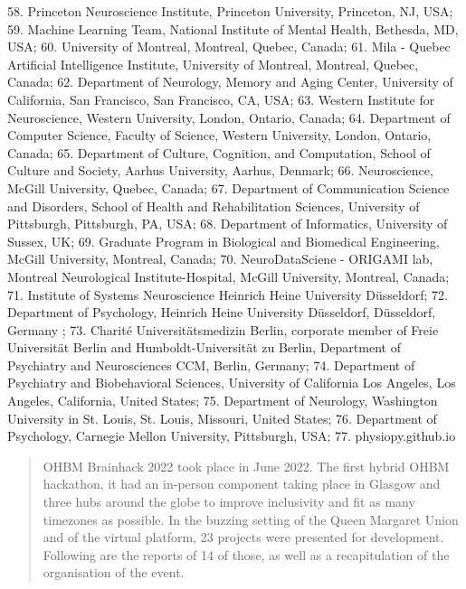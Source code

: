 \documentclass[10pt,a4paper,twocolumns]{proc}
\begin{document}
{58. Princeton Neuroscience Institute, Princeton University, Princeton, NJ, USA; %
59. Machine Learning Team, National Institute of Mental Health, Bethesda, MD, USA; %
60. University of Montreal, Montreal, Quebec, Canada; %
61. Mila - Quebec Artificial Intelligence Institute, University of Montreal, Montreal, Quebec, Canada; %
62. Department of Neurology, Memory and Aging Center, University of California, San Francisco, San Francisco, CA, USA; %
63. Western Institute for Neuroscience, Western University, London, Ontario, Canada; %
64. Department of Computer Science, Faculty of Science, Western University, London, Ontario, Canada; %
65. Department of Culture, Cognition, and Computation, School of Culture and Society, Aarhus University, Aarhus, Denmark; %
66. Neuroscience, McGill University, Quebec, Canada; %
67. Department of Communication Science and Disorders, School of Health and Rehabilitation Sciences, University of Pittsburgh, Pittsburgh, PA, USA; %
68. Department of Informatics, University of Sussex, UK; %
69. Graduate Program in Biological and Biomedical Engineering, McGill University, Montreal, Canada; %
70. NeuroDataSciene - ORIGAMI lab, Montreal Neurological Institute-Hospital, McGill University, Montreal, Canada; %
71. Institute of Systems Neuroscience Heinrich Heine University Düsseldorf; %
72. Department of Psychology, Heinrich Heine University Düsseldorf, Düsseldorf, Germany ; %
73. Charité Universitätsmedizin Berlin, corporate member of Freie Universität Berlin and Humboldt-Universität zu Berlin, Department of Psychiatry and Neurosciences CCM, Berlin, Germany; %
74. Department of Psychiatry and Biobehavioral Sciences, University of California Los Angeles, Los Angeles, California, United States; %
75. Department of Neurology, Washington University in St. Louis, St. Louis, Missouri, United States; %
76. Department of Psychology, Carnegie Mellon University, Pittsburgh, USA; %
77. physiopy.github.io %
}
\\

\begin{abstract}
OHBM Brainhack 2022 took place in June 2022. The first hybrid OHBM hackathon, it had an in-person component taking place in Glasgow and three hubs around the globe to improve inclusivity and fit as many timezones as possible.
In the buzzing setting of the Queen Margaret Union and of the virtual platform, 23 projects were presented for development.
Following are the reports of 14 of those, as well as a recapitulation of the organisation of the event. 
\end{abstract}
\end{document}
